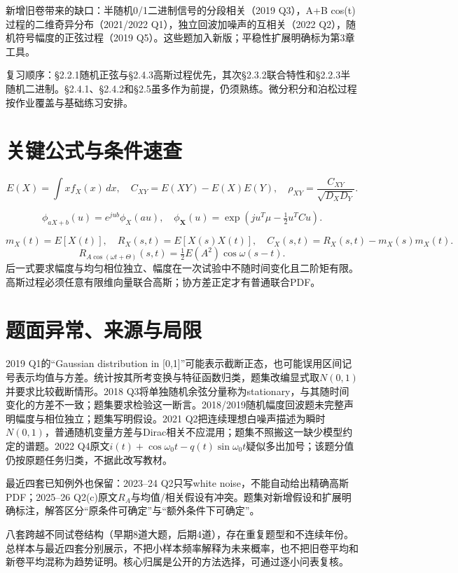 \documentclass[11pt,fontset=fandol]{ctexart}
\begin{document}
新增旧卷带来的缺口：半随机0/1二进制信号的分段相关（2019 Q3），A+B cos(t)过程的二维奇异分布（2021/2022 Q1），独立回波加噪声的互相关（2022 Q2），随机符号幅度的正弦过程（2019 Q5）。这些题加入新版；平稳性扩展明确标为第3章工具。

复习顺序：§2.2.1随机正弦与§2.4.3高斯过程优先，其次§2.3.2联合特性和§2.2.3半随机二进制。§2.4.1、§2.4.2和§2.5虽多作为前提，仍须熟练。微分积分和泊松过程按作业覆盖与基础练习安排。

\section{关键公式与条件速查}

\[E(X)=\int xf_X(x)\,dx,\quad C_{XY}=E(XY)-E(X)E(Y),\quad \rho_{XY}=\frac{C_{XY}}{\sqrt{D_XD_Y}}.\]

\[\phi_{aX+b}(u)=e^{jub}\phi_X(au),\quad \phi_{\boldsymbol X}(u)=\exp(ju^T\mu-\tfrac12u^TCu).\]

\[m_X(t)=E[X(t)],\quad R_X(s,t)=E[X(s)X(t)],\quad C_X(s,t)=R_X(s,t)-m_X(s)m_X(t).\]\[R_{A\cos(\omega t+\Theta)}(s,t)=\tfrac12 E(A^2)\cos\omega(s-t).\]后一式要求幅度与均匀相位独立、幅度在一次试验中不随时间变化且二阶矩有限。高斯过程必须任意有限维向量联合高斯；协方差正定才有普通联合PDF。

\section{题面异常、来源与局限}

\begin{warnbox}[title=不能静默补条件]2019 Q1的“Gaussian distribution in [0,1]”可能表示截断正态，也可能误用区间记号表示均值与方差。统计按其所考变换与特征函数归类，题集改编显式取$N(0,1)$并要求比较截断情形。2018 Q3将单独随机余弦分量称为stationary，与其随时间变化的方差不一致；题集要求检验这一断言。2018/2019随机幅度回波题未完整声明幅度与相位独立；题集写明假设。2021 Q2把连续理想白噪声描述为瞬时$N(0,1)$，普通随机变量方差与Dirac相关不应混用；题集不照搬这一缺少模型约定的谱题。2022 Q4原文$i(t)+\cos\omega_0t-q(t)\sin\omega_0t$疑似多出加号；该题分值仍按原题任务归类，不据此改写教材。\end{warnbox}

最近四套已知例外也保留：2023--24 Q2只写white noise，不能自动给出精确高斯PDF；2025--26 Q2(c)原文$R_A$与均值/相关假设有冲突。题集对新增假设和扩展明确标注，解答区分“原条件可确定”与“额外条件下可确定”。

八套跨越不同试卷结构（早期8道大题，后期4道），存在重复题型和不连续年份。总样本与最近四套分别展示，不把小样本频率解释为未来概率，也不把旧卷平均和新卷平均混称为趋势证明。核心归属是公开的方法选择，可通过逐小问表复核。
\end{document}
